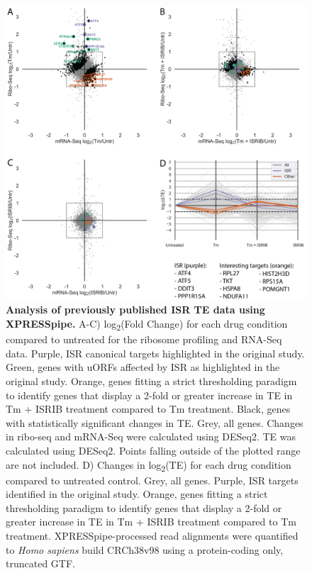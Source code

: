 \documentclass[10pt, oneside]{article}
\begin{document}
\begin{figure}
\centering
  \includegraphics[width=180mm]{figures/xpresspipe_figure3.png}
  \caption{\textbf{Analysis of previously published ISR TE data using XPRESSpipe.} A-C) log\textsubscript{2}(Fold Change) for each drug condition compared to untreated for the ribosome profiling and RNA-Seq data. Purple, ISR canonical targets highlighted in the original study. Green, genes with uORFs affected by ISR as highlighted in the original study. Orange, genes fitting a strict thresholding paradigm to identify genes that display a 2-fold or greater increase in TE in Tm + ISRIB treatment compared to Tm treatment. Black, genes with statistically significant changes in TE. Grey, all genes. Changes in ribo-seq and mRNA-Seq were calculated using DESeq2. TE was calculated using DESeq2. Points falling outside of the plotted range are not included. D) Changes in log\textsubscript{2}(TE) for each drug condition compared to untreated control. Grey, all genes. Purple, ISR targets identified in the original study. Orange, genes fitting a strict thresholding paradigm to identify genes that display a 2-fold or greater increase in TE in Tm + ISRIB treatment compared to Tm treatment. XPRESSpipe-processed read alignments were quantified to \textit{Homo sapiens} build CRCh38v98 using a protein-coding only, truncated GTF.}
  \label{fig:figure3}
\end{figure}
\end{document}
